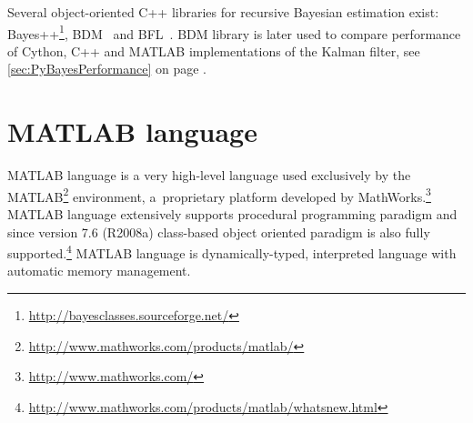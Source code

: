 Several object-oriented C++ libraries for recursive Bayesian estimation exist:
Bayes++\footnote{\url{http://bayesclasses.sourceforge.net/}}, BDM~\cite{BDM} and BFL~\cite{BFL}.
BDM library is later used to compare performance of Cython, C++ and MATLAB implementations of the
Kalman filter, see \autoref{sec:PyBayesPerformance} on page \pageref{sec:PyBayesPerformance}.

\section{MATLAB language}

MATLAB language is a very high-level language used exclusively by the
MATLAB\footnote{\url{http://www.mathworks.com/products/matlab/}} environment, a~proprietary platform
developed by MathWorks.\footnote{\url{http://www.mathworks.com/}} MATLAB language extensively
supports procedural programming paradigm and since version 7.6 (R2008a) class-based object oriented
paradigm is also fully supported.\footnote{\url{http://www.mathworks.com/products/matlab/whatsnew.html}}
MATLAB language is dynamically-typed, interpreted language with automatic memory management.

